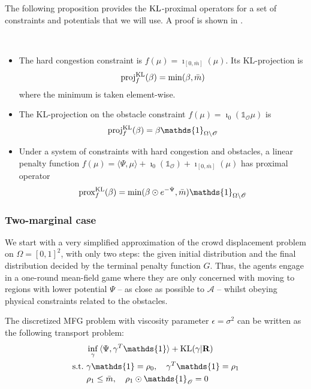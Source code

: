 \documentclass[../report.tex]{subfiles}
\begin{document}
The following proposition provides the $\operatorname{KL}$-proximal operators for a set of constraints and potentials that we will use. A proof is shown in \textcite{peyr2015entropic}.
\begin{prop}\label{prop:CrowdKLProx}~
\begin{itemize}
	\item The hard congestion constraint is $f(\mu) = \imath_{[0,\bar{m}]}(\mu)$. Its KL-projection is
	\begin{equation}
	\operatorname{proj}^{\operatorname{KL}}_f(\beta) = \min(\beta,\bar{m})
	\end{equation}
	where the minimum is taken element-wise.
	\item The KL-projection on the obstacle constraint $f(\mu) = \imath_{0} (\mathds{1}_\mathscr{O}\mu)$ is
	\begin{equation}
	\proj^{\KL}_f (\beta) = \beta \mathds{1}_{\Omega\backslash\mathscr{O}}
	\end{equation}
	\item Under a system of constraints with hard congestion and obstacles, a linear penalty function $f(\mu) = \langle\Psi, \mu\rangle + \imath_0(\mathds{1}_\mathscr{O}) + \imath_{[0,\bar{m}]}(\mu)$ has proximal operator
	\begin{equation}
	\prox^{\KL}_{f}(\beta) =
	\min(\beta\odot e^{-\Psi}, \bar{m}) \mathds{1}_{\Omega\backslash\mathscr{O}}
	\end{equation}
\end{itemize}
\end{prop}


\subsubsection{Two-marginal case}

We start with a very simplified approximation of the crowd displacement problem on $\Omega = [0, 1]^2$, with only two steps: the given initial distribution and the final distribution decided by the terminal penalty function $G$. 
Thus, the agents engage in a one-round mean-field game where they are only concerned with moving to regions with lower potential $\Psi$ -- as close as possible to $\mathscr{A}$ -- whilst obeying physical constraints related to the obstacles.

The discretized MFG problem with viscosity parameter $\epsilon = \sigma^2$ can be written as the following transport problem:
\begin{equation}\label{eq:2MargFuzzyObstacleObj}
\begin{aligned}
	&\inf_\gamma{} \langle \Psi, \gamma^T\mathds{1}\rangle + \KL(\gamma | \bfR) \\
	\suchthat\ & \gamma\mathds{1} = \rho_0, \quad \gamma^T\mathds{1} = \rho_1  \\
	& \rho_1 \leq \bar{m}, \quad \rho_1\odot \mathds{1}_{\mathscr{O}} = 0
	\end{aligned}
\end{equation}
\end{document}
